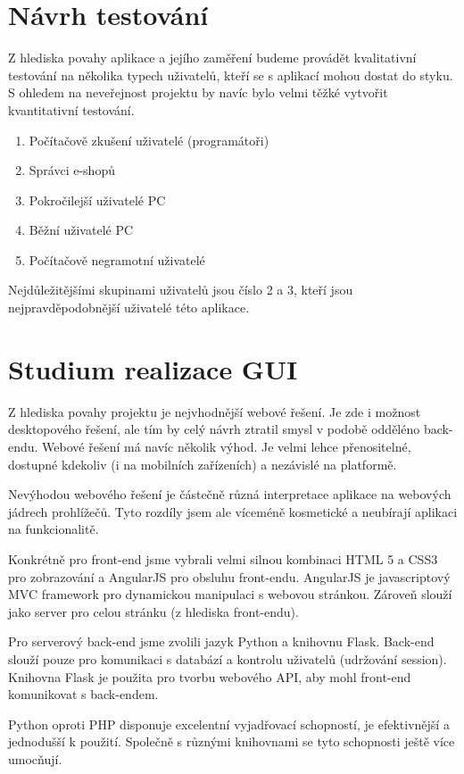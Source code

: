 \documentclass[11pt,a4paper]{article}
\begin{document}

\section*{Návrh testování}
Z hlediska povahy aplikace a jejího zaměření budeme provádět kvalitativní testování na několika typech uživatelů, kteří se s aplikací mohou dostat do styku. S ohledem na neveřejnost projektu by navíc bylo velmi těžké vytvořit kvantitativní testování.
\begin{enumerate}
	\item{Počítačově zkušení uživatelé (programátoři)}
	\item{Správci e-shopů}
	\item{Pokročilejší uživatelé PC}
	\item{Běžní uživatelé PC}
	\item{Počítačově negramotní uživatelé}
\end{enumerate}

Nejdůležitějšími skupinami uživatelů jsou číslo 2 a 3, kteří jsou nejpravděpodobnější uživatelé této aplikace. 

\section*{Studium realizace GUI}
Z hlediska povahy projektu je nejvhodnější webové řešení. Je zde i možnost desktopového řešení, ale tím by celý návrh ztratil smysl v podobě odděléno back-endu. Webové řešení má navíc několik výhod. Je velmi lehce přenositelné, dostupné kdekoliv (i na mobilních zařízeních) a nezávislé na platformě.

Nevýhodou webového řešení je částečně různá interpretace aplikace na webových jádrech prohlížečů. Tyto rozdíly jsem ale víceméně kosmetické a neubírají aplikaci na funkcionalitě.

Konkrétně pro front-end jsme vybrali velmi silnou kombinaci HTML 5 a CSS3 pro zobrazování a AngularJS pro obsluhu front-endu. AngularJS je javascriptový MVC framework pro dynamickou manipulaci s webovou stránkou. Zároveň slouží jako server pro celou stránku (z hlediska front-endu).

Pro serverový back-end jsme zvolili jazyk Python a knihovnu Flask. Back-end slouží pouze pro komunikaci s databází a kontrolu uživatelů (udržování session). Knihovna Flask je použita pro tvorbu webového API, aby mohl front-end komunikovat s back-endem. 

Python oproti PHP disponuje excelentní vyjadřovací schopností, je efektivnější a jednodušší k použití. Společně s různými knihovnami se tyto schopnosti ještě více umocňují.
\end{document}
